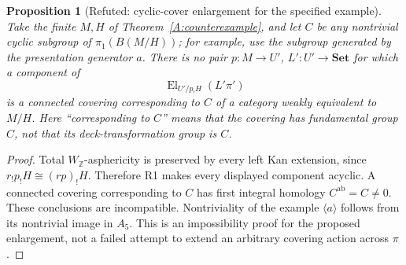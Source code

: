 \documentclass[11pt,a4paper]{article}
\newtheorem{proposition}[theorem]{Proposition}
\theoremstyle{definition}
\theoremstyle{remark}
\newcommand{\Set}{\mathbf{Set}}
\newcommand{\WZ}{W_{\mathbb Z}}
\newcommand{\El}{\operatorname{El}}
\begin{document}
\begin{proposition}[Refuted: cyclic-cover enlargement for the specified example]\label{A:enlargement}
Take the finite $M,H$ of Theorem~\ref{A:counterexample}, and let $C$ be any nontrivial cyclic subgroup of $\pi_1(B(M/H))$; for example, use the subgroup generated by the presentation generator $a$. There is no pair $p:M\to U'$, $L':U'\to\Set$ for which a component of
\[
 \El_{U'/p_!H}(L'\pi')
\]
is a connected covering corresponding to $C$ of a category weakly equivalent to $M/H$. Here ``corresponding to $C$'' means that the covering has fundamental group $C$, not that its deck-transformation group is $C$.
\end{proposition}
\begin{proof}
Total $\WZ$-asphericity is preserved by every left Kan extension, since $r_!p_!H\cong(rp)_!H$. Therefore R1 makes every displayed component acyclic. A connected covering corresponding to $C$ has first integral homology $C^{\mathrm{ab}}=C\ne0$. These conclusions are incompatible. Nontriviality of the example $\langle a\rangle$ follows from its nontrivial image in $A_5$. This is an impossibility proof for the proposed enlargement, not a failed attempt to extend an arbitrary covering action across $\pi$.
\end{proof}
\end{document}
